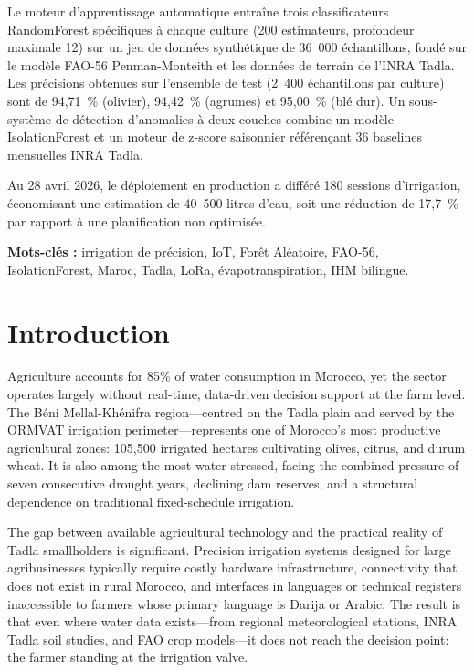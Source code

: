 \documentclass[12pt,a4paper]{report}
\begin{document}
Le moteur d'apprentissage automatique entraîne trois classificateurs RandomForest spécifiques à chaque culture (200 estimateurs, profondeur maximale 12) sur un jeu de données synthétique de 36~000 échantillons, fondé sur le modèle FAO-56 Penman-Monteith et les données de terrain de l'INRA Tadla. Les précisions obtenues sur l'ensemble de test (2~400 échantillons par culture) sont de 94,71~\% (olivier), 94,42~\% (agrumes) et 95,00~\% (blé dur). Un sous-système de détection d'anomalies à deux couches combine un modèle IsolationForest et un moteur de z-score saisonnier référençant 36 baselines mensuelles INRA Tadla.

Au 28 avril 2026, le déploiement en production a différé 180 sessions d'irrigation, économisant une estimation de 40~500 litres d'eau, soit une réduction de 17,7~\% par rapport à une planification non optimisée.

\textbf{Mots-clés :} irrigation de précision, IoT, Forêt Aléatoire, FAO-56, IsolationForest, Maroc, Tadla, LoRa, évapotranspiration, IHM bilingue.


\chapter{Introduction}

Agriculture accounts for 85\% of water consumption in Morocco, yet the sector operates largely without real-time, data-driven decision support at the farm level. The Béni Mellal-Khénifra region---centred on the Tadla plain and served by the ORMVAT irrigation perimeter---represents one of Morocco's most productive agricultural zones: 105,500 irrigated hectares cultivating olives, citrus, and durum wheat. It is also among the most water-stressed, facing the combined pressure of seven consecutive drought years, declining dam reserves, and a structural dependence on traditional fixed-schedule irrigation.

The gap between available agricultural technology and the practical reality of Tadla smallholders is significant. Precision irrigation systems designed for large agribusinesses typically require costly hardware infrastructure, connectivity that does not exist in rural Morocco, and interfaces in languages or technical registers inaccessible to farmers whose primary language is Darija or Arabic. The result is that even where water data exists---from regional meteorological stations, INRA Tadla soil studies, and FAO crop models---it does not reach the decision point: the farmer standing at the irrigation valve.
\end{document}
